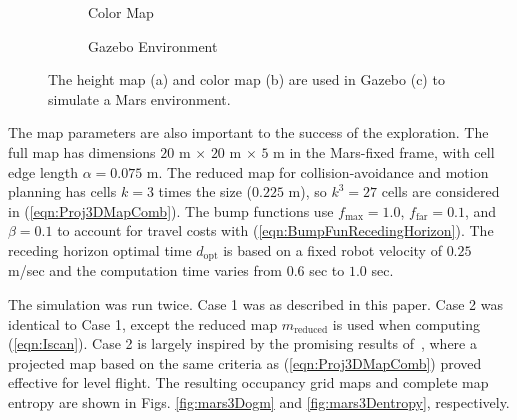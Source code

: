\documentclass[conf]{new-aiaa}
\newcommand{\refeqn}[1]{(\ref{eqn:#1})}
\begin{document}
\begin{figure}[!t]
\begin{subfigure}[t]{0.3\columnwidth}
        		\caption{Color Map}
    	\end{subfigure}
    	\begin{subfigure}[t]{0.3\columnwidth}
        		\caption{Gazebo Environment}
    	\end{subfigure}
\caption{The height map (a) and color map (b) are used in Gazebo (c) to simulate a Mars environment.}
\label{fig:MarsGazebo}
\end{figure}

The map parameters are also important to the success of the exploration. The full map has dimensions $20$ m $\times$ $20$ m $\times$ $5$ m in the Mars-fixed frame, with cell edge length $\alpha=0.075$ m. The reduced map for collision-avoidance and motion planning has cells $k=3$ times the size ($0.225$ m), so $k^3=27$ cells are considered in \refeqn{Proj3DMapComb}. The bump functions use $f_\text{max}=1.0$, $f_\text{far}=0.1$, and $\beta=0.1$ to account for travel costs with \refeqn{BumpFunRecedingHorizon}. The receding horizon optimal time $d_\text{opt}$ is based on a fixed robot velocity of $0.25$ m/sec and the computation time varies from $0.6$ sec to $1.0$ sec.

The simulation was run twice. Case 1 was as described in this paper. Case 2 was identical to Case 1, except the reduced map $ m_\text{reduced}$ is used when computing \refeqn{Iscan}. Case 2 is largely inspired by the promising results of~\cite{KauTakAiLee18}, where a projected map based on the same criteria as \refeqn{Proj3DMapComb} proved effective for level flight. The resulting occupancy grid maps and complete map entropy are shown in Figs. \ref{fig:mars3Dogm} and \ref{fig:mars3Dentropy}, respectively.
\end{document}
